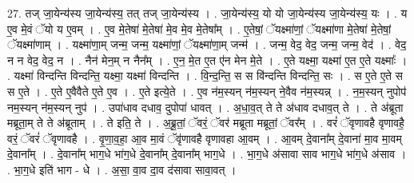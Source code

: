 \documentclass[17pt]{extarticle}
\begin{document}
27. तज् जा॒येन्य॑स्य जा॒येन्य॑स्य॒ तत् तज् जा॒येन्य॑स्य । . जा॒येन्य॑स्य॒ यो यो जा॒येन्य॑स्य जा॒येन्य॑स्य॒ यः । . य ए॒व मे॒वं ॅयो य ए॒वम् । . ए॒व मे॒तेषा॑ मे॒तेषा॑ मे॒व मे॒व मे॒तेषा᳚म् । . ए॒तेषां॒ ॅयक्ष्मा॑णां॒ ॅयक्ष्मा॑णा मे॒तेषा॑ मे॒तेषां॒ ॅयक्ष्मा॑णाम् । . यक्ष्मा॑णा॒म् जन्म॒ जन्म॒ यक्ष्मा॑णां॒ ॅयक्ष्मा॑णा॒म् जन्म॑ । . जन्म॒ वेद॒ वेद॒ जन्म॒ जन्म॒ वेद॑ । . वेद॒ न न वेद॒ वेद॒ न । . नैन॑ मेन॒म् न नैन᳚म् । . ए॒न॒ मे॒त ए॒त ए॑न मेन मे॒ते । . ए॒ते यक्ष्मा॒ यक्ष्मा॑ ए॒त ए॒ते यक्ष्माः᳚ । . यक्ष्मा॑ विन्दन्ति विन्दन्ति॒ यक्ष्मा॒ यक्ष्मा॑ विन्दन्ति । . वि॒न्द॒न्ति॒ स स वि॑न्दन्ति विन्दन्ति॒ सः । . स ए॒ते ए॒ते स स ए॒ते । . ए॒ते ए॒वैवैते ए॒ते ए॒व । . ए॒ते इत्ये॒ते । . ए॒व न॑म॒स्यन् न॑म॒स्यन् ने॒वैव न॑म॒स्यन्न् । . न॒म॒स्यन् नुपोप॑ नम॒स्यन् न॑म॒स्यन् नुप॑ । . उपा॑धाव दधाव॒ दुपोपा॑ धावत् । . अ॒धा॒व॒त् ते ते अ॑धाव दधाव॒त् ते । . ते अ॑ब्रूता मब्रूता॒म् ते ते अ॑ब्रूताम् । . ते इति॒ ते । . अ॒ब्रू॒तां॒ ॅवरं॒ ॅवर॑ मब्रूता मब्रूतां॒ ॅवर᳚म् । . वरं॑ ॅवृणावहै वृणावहै॒ वरं॒ ॅवरं॑ ॅवृणावहै । . वृ॒णा॒व॒हा॒ आ॒व मा॒वं ॅवृ॑णावहै वृणावहा आ॒वम् । . आ॒वम् दे॒वाना᳚म् दे॒वाना॑ मा॒व मा॒वम् दे॒वाना᳚म् । . दे॒वाना᳚म् भाग॒धे भा॑ग॒धे दे॒वाना᳚म् दे॒वाना᳚म् भाग॒धे । . भा॒ग॒धे अ॑सावा साव भाग॒धे भा॑ग॒धे अ॑साव । . भा॒ग॒धे इति॑ भाग - धे । . अ॒सा॒ वा॒व दा॒व द॑सावा सावा॒वत् । \newline
\end{document}
